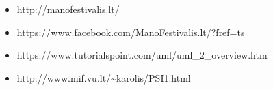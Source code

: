 ﻿\documentclass{VUMIFPSkursinis}
\begin{document}
\begin{itemize}
\item http://manofestivalis.lt/
\item https://www.facebook.com/ManoFestivalis.lt/?fref=ts
\item https://www.tutorialspoint.com/uml/uml\_2\_overview.htm
\item http://www.mif.vu.lt/\textasciitilde karolis/PSI1.html
\end{itemize}


%
%
\end{document}
